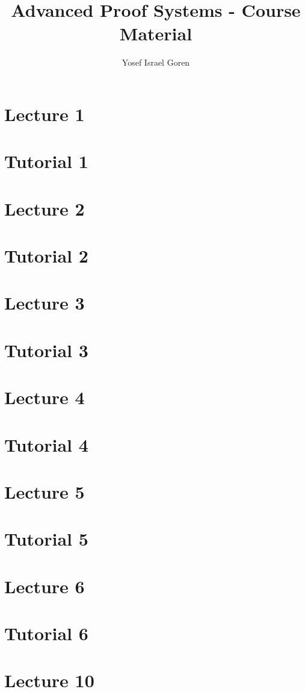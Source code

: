 \documentclass{article}
\title{Advanced Proof Systems - Course Material}
\author{Yosef Israel Goren}
\theoremstyle{definition}
\begin{document}
\maketitle

\part*{Lecture 1}

\part*{Tutorial 1}

\part*{Lecture 2}

\part*{Tutorial 2}

\part*{Lecture 3}

\part*{Tutorial 3}

\part*{Lecture 4}

\part*{Tutorial 4}

\part*{Lecture 5}

\part*{Tutorial 5}

\part*{Lecture 6}

\part*{Tutorial 6}


\part*{Lecture 10}

\end{document}
